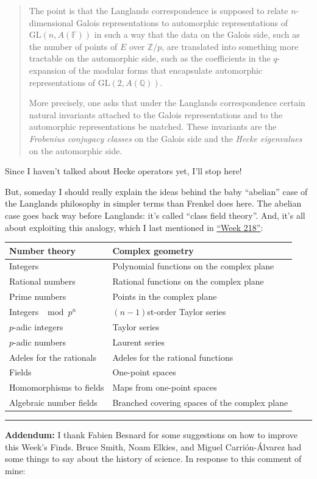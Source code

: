 \documentclass{article}
\begin{document}
\begin{quote}
The point is that the Langlands correspondence is supposed to relate
\(n\)-dimensional Galois representations to automorphic representations
of \(\mathrm{GL}(n,A(\mathbb{F}))\) in such a way that the data on the
Galois side, such as the number of points of \(E\) over
\(\mathbb{Z}/p\), are translated into something more tractable on the
automorphic side, such as the coefficients in the \(q\)-expansion of the
modular forms that encapsulate automorphic representations of
\(\mathrm{GL}(2,A(\mathbb{Q}))\).

More precisely, one asks that under the Langlands correspondence certain
natural invariants attached to the Galois representations and to the
automorphic representations be matched. These invariants are the
\emph{Frobenius conjugacy classes} on the Galois side and the
\emph{Hecke eigenvalues} on the automorphic side.
\end{quote}

Since I haven't talked about Hecke operators yet, I'll stop here!

But, someday I should really explain the ideas behind the baby
``abelian'' case of the Langlands philosophy in simpler terms than
Frenkel does here. The abelian case goes back way before Langlands: it's
called ``class field theory''. And, it's all about exploiting this
analogy, which I last mentioned in \protect\hyperlink{week218}{``Week
218''}:

\begin{longtable}[]{@{}ll@{}}
\toprule
Number theory & Complex geometry\tabularnewline
\midrule
\endhead
Integers & Polynomial functions on the complex plane\tabularnewline
Rational numbers & Rational functions on the complex
plane\tabularnewline
Prime numbers & Points in the complex plane\tabularnewline
Integers \(\mod p^n\) & \((n-1)\)st-order Taylor series\tabularnewline
\(p\)-adic integers & Taylor series\tabularnewline
\(p\)-adic numbers & Laurent series\tabularnewline
Adeles for the rationals & Adeles for the rational
functions\tabularnewline
Fields & One-point spaces\tabularnewline
Homomorphisms to fields & Maps from one-point spaces\tabularnewline
Algebraic number fields & Branched covering spaces of the complex
plane\tabularnewline
\bottomrule
\end{longtable}

\begin{center}\rule{0.5\linewidth}{0.5pt}\end{center}

\textbf{Addendum:} I thank Fabien Besnard for some suggestions on how to
improve this Week's Finds. Bruce Smith, Noam Elkies, and Miguel
Carrión-Álvarez had some things to say about the history of science. In
response to this comment of mine:
\end{document}
